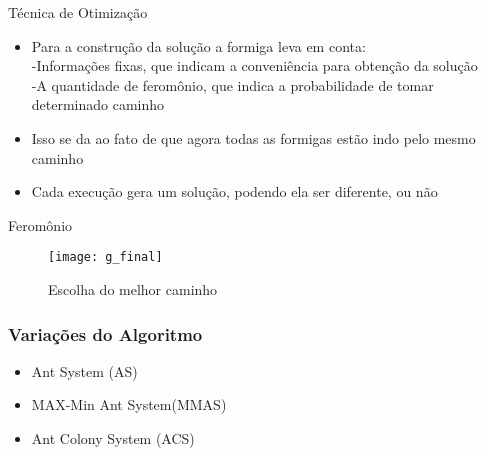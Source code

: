 \documentclass[compress]{beamer}
\begin{document}
\begin{frame}{Técnica de Otimização}
\begin{itemize}
\item{Para a construção da solução a formiga leva em conta:\\ -Informações fixas, que indicam a conveniência para obtenção da solução\\ -A quantidade de feromônio, que indica a probabilidade de tomar determinado caminho}
\newline
\item{Isso se da ao fato de que agora todas as formigas estão indo pelo mesmo caminho}
\newline
\item{Cada execução gera um solução, podendo ela ser diferente, ou não}
\end{itemize}
\end{frame}

\begin{frame}{Feromônio}
\begin{figure}[!htb]
    \centering
    \texttt{[image: g\_final]}
    \caption{Escolha do melhor caminho}
\end{figure}
\end{frame}








 

\begin{frame}
\frametitle{Variações do Algoritmo}

\begin{itemize}
  \item Ant System (AS)
  \item MAX-Min Ant System(MMAS)
  \item Ant Colony System (ACS)
\end{itemize}
\end{frame}
\end{document}
